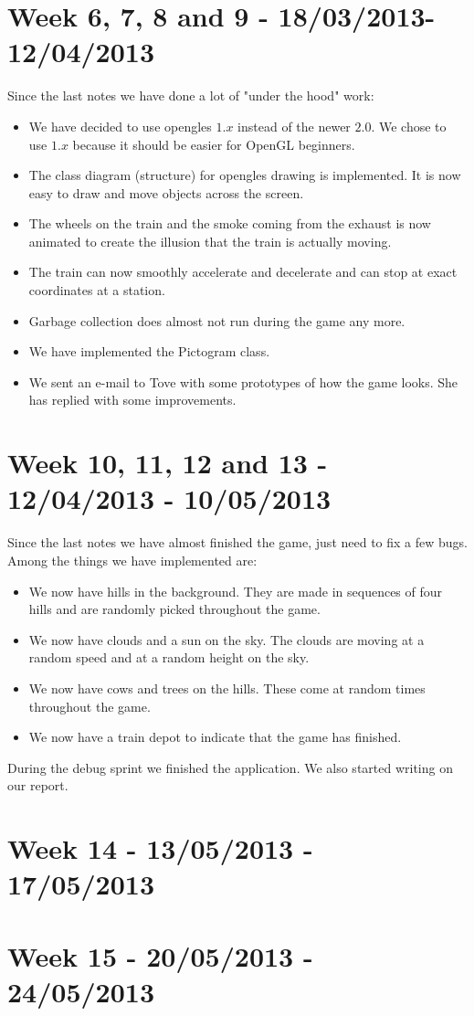 \section*{Week 6, 7, 8 and 9 - 18/03/2013-12/04/2013}
Since the last notes we have done a lot of "under the hood" work:

\begin{itemize}
\item We have decided to use \ac{opengles} $1.x$ instead of the newer $2.0$. We chose to use $1.x$ because it should be easier for OpenGL beginners. 
\item The class diagram (structure) for \ac{opengles} drawing is implemented. It is now easy to draw and move objects across the screen. 
\item The wheels on the train and the smoke coming from the exhaust is now animated to create the illusion that the train is actually moving. 
\item The train can now smoothly accelerate and decelerate and can stop at exact coordinates at a station. 
\item Garbage collection does almost not run during the game any more.
\item We have implemented the Pictogram class.
\item We sent an e-mail to Tove with some prototypes of how the game looks. She has replied with some improvements.
\end{itemize} 

\section*{Week 10, 11, 12 and 13 - 12/04/2013 - 10/05/2013}
Since the last notes we have almost finished the game, just need to fix a few bugs. Among the things we have implemented are:

\begin{itemize}
\item We now have hills in the background. They are made in sequences of four hills and are randomly picked throughout the game. 
\item We now have clouds and a sun on the sky. The clouds are moving at a random speed and at a random height on the sky. 
\item We now have cows and trees on the hills. These come at random times throughout the game.
\item We now have a train depot to indicate that the game has finished. 
\end{itemize}
During the debug sprint we finished the application. We also started writing on our report. 

\section*{Week 14 - 13/05/2013 - 17/05/2013}
\section*{Week 15 - 20/05/2013 - 24/05/2013}
